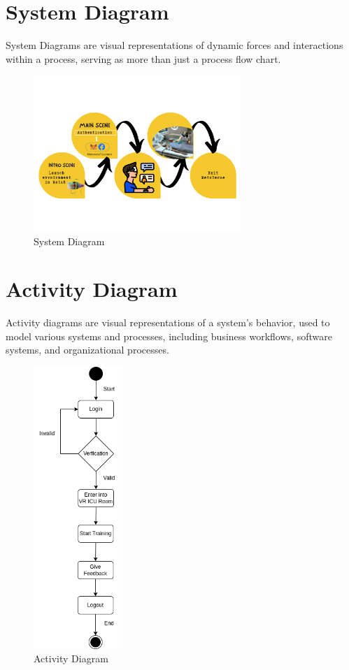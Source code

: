 \section{System Diagram}
System Diagrams are visual representations of dynamic forces and interactions within a process, serving as more than just a process flow chart.
\begin{figure}[h]
    \centering
    \includegraphics[width=0.7\textwidth, height=0.3\textheight]{Images/system.png}
    \caption{System Diagram}
    \label{fig:system-diagram}
\end{figure}


\section{Activity Diagram}
Activity diagrams are visual representations of a system's behavior, used to model various systems and processes, including business workflows, software systems, and organizational processes.
\begin{figure}[h]
    \centering
    \includegraphics[width=0.3\textwidth, height=0.6\textheight]{Images/Activity.drawio.png}
    \caption{Activity Diagram}
    \label{fig:system-diagram}
\end{figure}